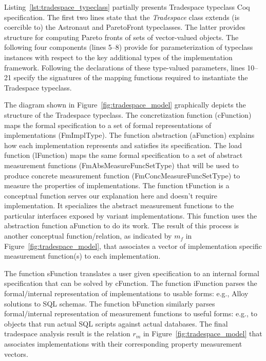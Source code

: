 \documentclass{sig-alternate}
\begin{document}
Listing~\ref{lst:tradespace_typeclass} partially presents Tradespace typeclass Coq specification. 
The first two lines state that the {\em Tradespace} class extends (is coercible to) the Astronaut and ParetoFront typeclasses. The latter provides structure for computing Pareto fronts of sets of vector-valued objects. The following four components (lines 5--8) provide for parameterization of typeclass instances with respect to the key additional types of the implementation framework. Following the declarations of these type-valued parameters, lines 10--21 specify the signatures of the mapping functions required to instantiate the Tradespace typeclass.

The diagram shown in Figure~\ref{fig:tradespace_model} graphically depicts the structure of the Tradespace typeclass.
The concretization function (\textsf{cFunction}) maps the formal specification to a set of formal representations of implementations (\textsf{FmImplType}). The function abstraction (\textsf{aFunction}) explains how each implementation represents and satisfies its specification. The load function (\textsf{lFunction}) maps the same formal specification to a set of abstract measurement functions (\textsf{FmAbsMeasureFuncSetType}) that will be used to produce concrete measurement function (\textsf{FmConcMeasureFuncSetType}) to measure the properties of implementations. The function \textsf{tFunction} is a conceptual function serves our explanation here and doesn't require implementation. It specializes the abstract measurement functions to the particular interfaces exposed by variant implementations. This function uses the abstraction function \textsf{aFunction} to do its work. The result of this process is another conceptual function/relation, as indicated by $m_f$ in Figure~\ref{fig:tradespace_model}, that associates a vector of implementation specific measurement function(s) to each implementation. 

The function \textsf{sFunction} translates a user given specification to an internal formal specification that can be solved by \textsf{cFunction}. The function \textsf{iFunction} parses the formal/internal representation of implementations to usable forms: e.g., Alloy solutions to SQL schemas. The function \textsf{bFunction} similarly parses formal/internal representation of measurement functions to useful forms: e.g., to objects that run actual SQL scripts against actual databases. The final tradespace analysis result is the relation $r_m$ in Figure~\ref{fig:tradespace_model} that associates implementations with their corresponding property measurement vectors.
\end{document}
